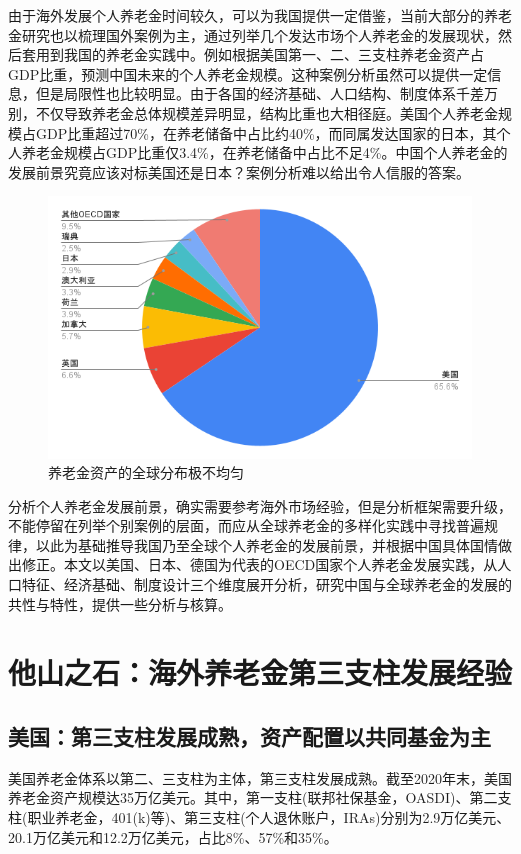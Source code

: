 \documentclass[a4paper,zihao=5]{ctexart}
\begin{document}
由于海外发展个人养老金时间较久，可以为我国提供一定借鉴，当前大部分的养老金研究也以梳理国外案例为主，通过列举几个发达市场个人养老金的发展现状，然后套用到我国的养老金实践中。例如根据美国第一、二、三支柱养老金资产占GDP比重，预测中国未来的个人养老金规模。这种案例分析虽然可以提供一定信息，但是局限性也比较明显。由于各国的经济基础、人口结构、制度体系千差万别，不仅导致养老金总体规模差异明显，结构比重也大相径庭。美国个人养老金规模占GDP比重超过70\%，在养老储备中占比约40\%，而同属发达国家的日本，其个人养老金规模占GDP比重仅3.4\%，在养老储备中占比不足4\%。中国个人养老金的发展前景究竟应该对标美国还是日本？案例分析难以给出令人信服的答案。
\begin{figure}[H]
    \centering
    \includegraphics[width=\linewidth]{img/totalOECDpensionassets.png}
    \caption{养老金资产的全球分布极不均匀}
\end{figure}

分析个人养老金发展前景，确实需要参考海外市场经验，但是分析框架需要升级，不能停留在列举个别案例的层面，而应从全球养老金的多样化实践中寻找普遍规律，以此为基础推导我国乃至全球个人养老金的发展前景，并根据中国具体国情做出修正。本文以美国、日本、德国为代表的OECD国家个人养老金发展实践，从人口特征、经济基础、制度设计三个维度展开分析，研究中国与全球养老金的发展的共性与特性，提供一些分析与核算。

\section{他山之石：海外养老金第三支柱发展经验}
\subsection{美国：第三支柱发展成熟，资产配置以共同基金为主}
美国养老金体系以第二、三支柱为主体，第三支柱发展成熟。截至2020年末，美国养老金资产规模达35万亿美元。其中，第一支柱(联邦社保基金，OASDI)、第二支柱(职业养老金，401(k)等)、第三支柱(个人退休账户，IRAs)分别为2.9万亿美元、20.1万亿美元和12.2万亿美元，占比8\%、57\%和35\%。
\end{document}
